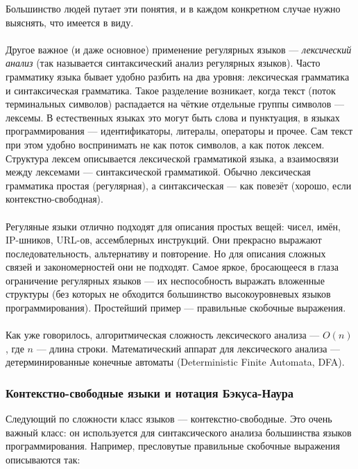 \documentclass[11pt]{book}
\begin{document}
Большинство людей путает эти понятия, и в каждом конкретном случае нужно выяснять, что имеется в виду.
\\ \\
Другое важное (и даже основное) применение регулярных языков --- \emph{лексический анализ}
(так называется синтаксический анализ регулярных языков).
Часто грамматику языка бывает удобно разбить на два уровня: лексическая грамматика и синтаксическая грамматика.
Такое разделение возникает, когда текст (поток терминальных символов) распадается на чёткие отдельные группы символов --- лексемы.
В естественных языках это могут быть слова и пунктуация, в языках программирования --- идентификаторы, литералы, операторы и прочее.
Сам текст при этом удобно воспринимать не как поток символов, а как поток лексем.
Структура лексем описывается лексической грамматикой языка, а взаимосвязи между лексемами --- синтаксической грамматикой.
Обычно лексическая грамматика простая (регулярная), а синтаксическая --- как повезёт (хорошо, если контекстно-свободная).
\\ \\
Регуляные языки отлично подходят для описания простых вещей: чисел, имён, IP-шников, URL-ов, ассемблерных инструкций.
Они прекрасно выражают последовательность, альтернативу и повторение.
Но для описания сложных связей и закономерностей они не подходят.
Самое яркое, бросающееся в глаза ограничение регулярных языков --- их неспособность выражать вложенные структуры
(без которых не обходится большинство высокоуровневых языков программирования).
Простейший пример --- правильные скобочные выражения.
\\ \\
Как уже говорилось, алгоритмическая сложность лексического анализа --- $O(n)$, где $n$ --- длина строки.
Математический аппарат для лексического анализа --- детерминированные конечные автоматы (Deterministic Finite Automata, DFA).

\subsubsection{Контекстно-свободные языки и нотация Бэкуса-Наура}
Следующий по сложности класс языков --- контекстно-свободные.
Это очень важный класс: он используется для синтаксического анализа большинства языков программирования.
Например, пресловутые правильные скобочные выражения описываются так:
\end{document}
